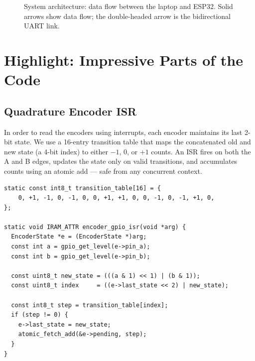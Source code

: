 \documentclass[11pt, letterpaper]{article}
\begin{document}
\begin{figure}[H]
\caption{System architecture: data flow between the laptop and ESP32.
  Solid arrows show data flow; the double-headed arrow is the
  bidirectional UART link.}
\label{fig:arch}
\end{figure}

\section{Highlight: Impressive Parts of the Code}

\subsection{Quadrature Encoder ISR}

In order to read the encoders using interrupts, each encoder maintains
its last 2-bit state. We use a 16-entry transition table that maps the
concatenated old and new state (a 4-bit index) to either $-1$, 0, or
$+1$ counts. An ISR fires on both the A and B edges, updates the state
only on valid transitions, and accumulates counts using an atomic
add --- safe from any concurrent context.

\begin{lstlisting}[style=clang]
static const int8_t transition_table[16] = {
    0, +1, -1, 0, -1, 0, 0, +1, +1, 0, 0, -1, 0, -1, +1, 0,
};

static void IRAM_ATTR encoder_gpio_isr(void *arg) {
  EncoderState *e = (EncoderState *)arg;
  const int a = gpio_get_level(e->pin_a);
  const int b = gpio_get_level(e->pin_b);

  const uint8_t new_state = (((a & 1) << 1) | (b & 1));
  const uint8_t index     = ((e->last_state << 2) | new_state);

  const int8_t step = transition_table[index];
  if (step != 0) {
    e->last_state = new_state;
    atomic_fetch_add(&e->pending, step);
  }
}
\end{lstlisting}
\end{document}
